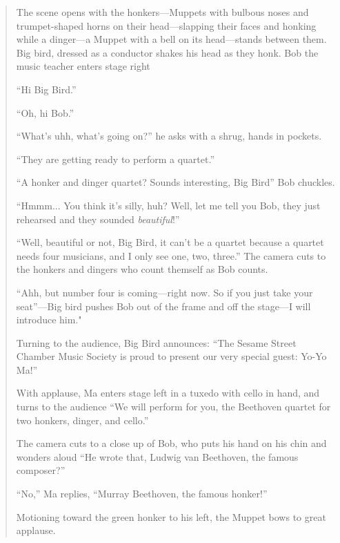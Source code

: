 \documentclass[12pt,letterpaper]{article}
\providecommand{\DIFaddbegin}{} %
\providecommand{\DIFaddend}{} %
\newcommand{\DIFaddincludegraphics}[2][]{{\color{blue}\fbox{\DIFOincludegraphics[#1]{#2}}}} %
\DeclareRobustCommand{\DIFaddbegin}{\DIFOaddbegin \let\includegraphics\DIFaddincludegraphics} %
\DeclareRobustCommand{\DIFaddend}{\DIFOaddend \let\includegraphics\DIFOincludegraphics} %
\begin{document}
	\begin{quote}

	\DIFaddbegin \ttfamily

	\DIFaddend The scene opens with the honkers---Muppets with bulbous noses and
	trumpet-shaped horns on their head---slapping their faces and honking 
	while a dinger---a Muppet with a bell on its head---stands between them.
	Big bird, dressed as a conductor shakes his head as they honk. Bob the
	music teacher enters stage right 

	``Hi Big Bird.''

	``Oh, hi Bob.''

	``What's uhh, what's going on?'' he asks with a shrug, hands in pockets.

	``They are getting ready to perform a quartet.''

	``A honker and dinger quartet? Sounds interesting, Big Bird'' Bob 
	chuckles.

	``Hmmm... You think it's silly, huh? Well, let me tell you Bob, they 
	just rehearsed and they sounded \textit{beautiful}!''

	``Well, beautiful or not, Big Bird, it can't be a quartet because a 
	quartet needs four musicians, and I only see one, two, three.'' The 
	camera cuts to the honkers and dingers who count themself as Bob counts.

	``Ahh, but number four is coming---right now. So if you just take your 
	seat''---Big bird pushes Bob out of the frame and off the stage---I will
	introduce him."

	Turning to the audience, Big Bird announces: ``The Sesame Street Chamber
	Music Society is proud to present our very special guest: Yo-Yo Ma!''

	With applause, Ma enters stage left in a tuxedo with cello in hand, and
	turns to the audience ``We will perform for you, the Beethoven quartet 
	for two honkers, dinger, and cello.'' 

	The camera cuts to a close up of Bob, who puts his hand on his chin and 	wonders aloud ``He wrote that, Ludwig van Beethoven, the famous 
	composer?''

	``No,'' Ma replies, ``Murray Beethoven, the famous honker!''

	Motioning toward the green honker to his left, the Muppet bows to great 
	applause.


\end{quote}
\end{document}

